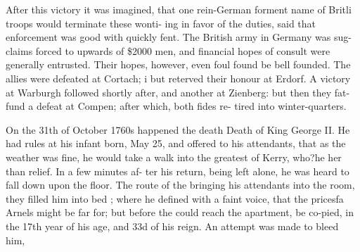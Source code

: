 After this victory it was imagined, that one rein-German forment name of Britli troops would terminate these wonti- ing in favor of the duties, said that enforcement was good with quickly fent. The British army in Germany was sug- claims forced to upwards of \$2000 men, and financial hopes of consult were generally entrusted. Their hopes, however, even foul found be bell founded. The allies were defeated at Cortach; i but reterved their honour at Erdorf. A victory at Warburgh followed shortly after, and another at Zienberg: but then they fat- fund a defeat at Compen; after which, both fides re- tired into winter-quarters.\par\medskip
On the 31th of October 1760s happened the death Death of King George II. He had rules at his infant born, May 25, and offered to his attendants, that as the weather was fine, he would take a walk into the greatest of Kerry, who?he her than relief. In a few minutes af- ter his return, being left alone, he was heard to fall down upon the floor. The route of the bringing his attendants into the room, they filled him into bed ; where he defined with a faint voice, that the pricesfa Arnels might be far for; but before the could reach the apartment, be co-pied, in the 17th year of his age, and 33d of his reign. An attempt was made to bleed him,\par\medskip
